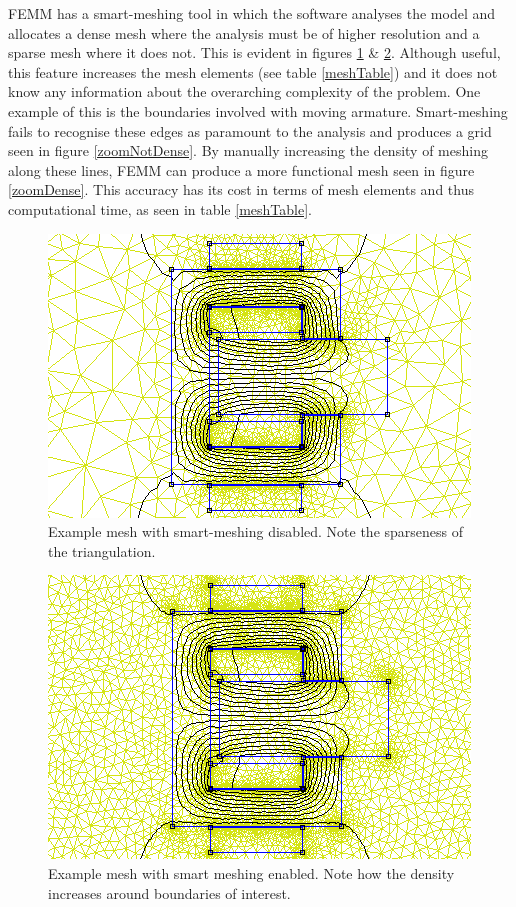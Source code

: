 \documentclass[a4paper]{IEEEtran}
\begin{document}
FEMM has a smart-meshing tool in which the software analyses the model and allocates a dense mesh where the analysis must be of higher resolution and a sparse mesh where it does not. This is evident in figures \ref{noSmartMesh} \& \ref{smartMesh}. Although useful, this feature increases the mesh elements (see table \ref{meshTable}) and it does not know any information about the overarching complexity of the problem. One example of this is the boundaries involved with moving armature. Smart-meshing fails to recognise these edges as paramount to the analysis and produces a grid seen in figure \ref{zoomNotDense}. By manually increasing the density of meshing along these lines, FEMM can produce a more functional mesh seen in figure \ref{zoomDense}. This accuracy has its cost in terms of mesh elements and thus computational time, as seen in table \ref{meshTable}.

\begin{figure}[ht]
\includegraphics[width = \linewidth]{Smartmesh-OFF-NotDenseAirgap.png}
\caption{Example mesh with smart-meshing disabled. Note the sparseness of the triangulation.}
\label{noSmartMesh} 
\end{figure}

\begin{figure}[ht]
\includegraphics[width = \linewidth]{Smartmesh-ON-NotDenseAirgap.png}
\caption{Example mesh with smart meshing enabled. Note how the density increases around boundaries of interest.}
\label{smartMesh} 
\end{figure}
\end{document}
